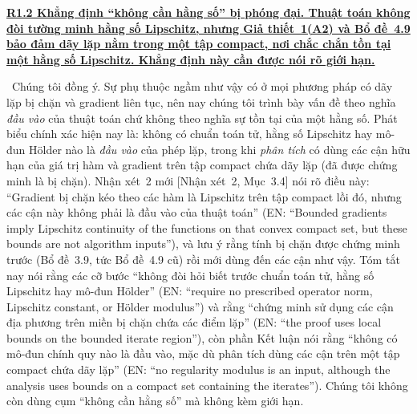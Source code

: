 \documentclass[11pt]{article}
\newcommand{\response}[1]{\smallskip\noindent{\color{blue!60!black}\textbf{Trả lời.}}\ #1\par\medskip}
\newcommand{\loc}[1]{\textcolor{blue!50!black}{[#1]}}
\newcommand{\en}[1]{{\color{gray}\small(EN: ``#1'')}}
\newenvironment{point}[1]{\medskip\noindent\textbf{\uline{#1}}\par}{\par}
\begin{document}
\begin{point}{R1.2 Khẳng định ``không cần hằng số'' bị phóng đại. Thuật toán không
đòi tường minh hằng số Lipschitz, nhưng Giả thiết~1(A2) và Bổ đề~4.9 bảo đảm
dãy lặp nằm trong một tập compact, nơi chắc chắn tồn tại một hằng số Lipschitz. Khẳng định
này cần được nói rõ giới hạn.}
\response{Chúng tôi đồng ý. Sự phụ thuộc ngầm như vậy có ở mọi phương pháp có dãy lặp bị chặn
và gradient liên tục, nên nay chúng tôi trình bày vấn đề theo nghĩa \emph{đầu vào} của thuật toán
chứ không theo nghĩa sự tồn tại của một hằng số. Phát biểu chính xác hiện nay là: không có
chuẩn toán tử, hằng số Lipschitz hay mô-đun H\"older nào là \emph{đầu vào} của
phép lặp, trong khi \emph{phân tích} có dùng các cận hữu hạn của giá trị hàm và
gradient trên tập compact chứa dãy lặp (đã được chứng minh là bị chặn). Nhận xét~2
mới \loc{Nhận xét~2, Mục~3.4} nói rõ điều này: ``Gradient bị chặn kéo theo các hàm là
Lipschitz trên tập compact lồi đó, nhưng các cận này không phải là đầu vào của
thuật toán'' \en{Bounded gradients imply
Lipschitz continuity of the functions on that convex compact set, but these bounds are
not algorithm inputs}, và lưu ý rằng tính bị chặn được chứng minh trước (Bổ đề~3.9, tức
Bổ đề~4.9 cũ) rồi mới dùng đến các cận như vậy. Tóm tắt nay nói rằng
các cỡ bước ``không đòi hỏi biết trước chuẩn toán tử, hằng số Lipschitz hay mô-đun H\"older''
\en{require no prescribed operator norm, Lipschitz constant, or H\"older modulus}
và rằng ``chứng minh sử dụng các cận địa phương trên miền bị chặn chứa các điểm lặp'' \en{the proof uses local bounds on the bounded iterate region}, còn phần Kết luận nói
rằng ``không có mô-đun chính quy nào là đầu vào, mặc dù phân tích dùng các cận trên một tập compact
chứa dãy lặp'' \en{no regularity modulus is an input, although the analysis uses bounds on a compact
set containing the iterates}. Chúng tôi không còn dùng cụm ``không cần hằng số'' mà không kèm giới hạn.}
\end{point}
\end{document}
